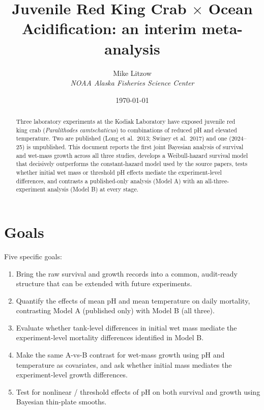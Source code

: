 \documentclass[11pt]{article}
\title{\bfseries Juvenile Red King Crab $\times$ Ocean Acidification: an interim meta-analysis}
\author{Mike Litzow \\ \textit{NOAA Alaska Fisheries Science Center}}
\date{\today}
\begin{document}
\maketitle

\begin{abstract}
\noindent Three laboratory experiments at the Kodiak Laboratory have exposed juvenile red king crab (\textit{Paralithodes camtschaticus}) to combinations of reduced pH and elevated temperature. Two are published (Long et al.\ 2013; Swiney et al.\ 2017) and one (2024--25) is unpublished. This document reports the first joint Bayesian analysis of survival and wet-mass growth across all three studies, develops a Weibull-hazard survival model that decisively outperforms the constant-hazard model used by the source papers, tests whether initial wet mass or threshold pH effects mediate the experiment-level differences, and contrasts a published-only analysis (Model A) with an all-three-experiment analysis (Model B) at every stage.
\end{abstract}

\section{Goals}

Five specific goals:
\begin{enumerate}
\item[(i)] Bring the raw survival and growth records into a common, audit-ready structure that can be extended with future experiments.
\item[(ii)] Quantify the effects of mean pH and mean temperature on daily mortality, contrasting Model A (published only) with Model B (all three).
\item[(iii)] Evaluate whether tank-level differences in initial wet mass mediate the experiment-level mortality differences identified in Model B.
\item[(iv)] Make the same A-vs-B contrast for wet-mass growth using pH and temperature as covariates, and ask whether initial mass mediates the experiment-level growth differences.
\item[(v)] Test for nonlinear / threshold effects of pH on both survival and growth using Bayesian thin-plate smooths.
\end{enumerate}

\end{document}
